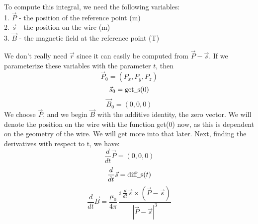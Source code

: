 \documentclass[12pt]{article}
\newcommand{\spaces}{\phantom{\qquad}}
\newcommand{\under}{\underline{\phantom{\enspace}}}
\newcommand{\diff}{\frac{d}{dt}}
\begin{document}
	To compute this integral, we need the following variables: \\
		\spaces 1. $\vec{P}$ - the position of the reference point (m)\\
		\spaces 2. $\vec{s}$ - the position on the wire (m)\\
		\spaces 3. $\vec{B}$ - the magnetic field at the reference point (T)
		
	We don't really need $\vec{r}$ since it can easily be computed from $\vec{P} - \vec{s}$. If we parameterize these variables with the parameter $t$, then
			$$\vec{P}_0 = (P_x, P_y, P_z)$$
			$$\vec{s}_0 = \text{get\under s}(0)$$
			$$\vec{B}_0 = (0, 0, 0)$$
	We choose $\vec{P}$, and we begin $\vec{B}$ with the additive identity, the zero vector. We will denote the position on the wire with the function get\under(0) now, as this is dependent on the geometry of the wire. We will get more into that later. Next, finding the derivatives with respect to t, we have:
			$$\diff \vec{P} = (0, 0, 0)$$
			$$\diff \vec{s} = \text{diff\under s}(t)$$
			$$\diff \vec{B} = \frac{\mu_0}{4\pi} \, \frac{i\,\diff \vec{s} \times \left(\vec{P} - \vec{s}\right)}{|\vec{P} - \vec{s}|^3}$$			
	 	 
	
		

\end{document}
